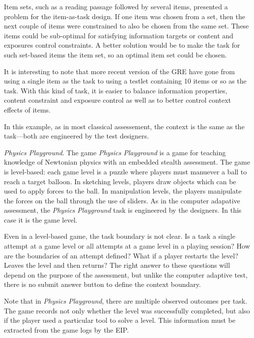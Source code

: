 \documentclass{article}
\begin{document}
  Item sets, such as a reading passage followed by several items,
  presented a problem for the item-as-task design.  If one item was
  chosen from a set, then the next couple of items were constrained to
  also be chosen from the same set.  These items could be sub-optimal
  for satisfying information targets or content and exposures control
  constraints.  A better solution would be to make the task for such
  set-based items the item set, so an optimal item set could be
  chosen.

  It is interesting to note that more recent version of the GRE have
  gone from using a single item as the task to using a testlet
  containing 10 items or so as the task.  With this kind of task, it
  is easier to balance information properties, content constraint and
  exposure control as well as to better control context effects of
  items.

  In this example, as in most classical assessement, the context is
  the same as the task---both are engineered by the test designers.

  \noindent\textit{Physics Playground}.  The game \textit{Physics
    Playground} \cite{ShuteVentura2013,KimPhysicsPlayground} is a
  game for teaching knowledge of Newtonian physics with an embedded
  stealth assessment.  The game is level-based: each game level
  is a puzzle where players must manuever a ball to reach a target
  balloon.  In sketching levels, players draw objects which can be
  used to apply forces to the ball.  In manipulation levels, the
  players manipulate the forces on the ball through the use of
  sliders. As in the computer adapative assessment, the
  \textit{Physics Playground} task is engineered by the designers.  In
  this case it is the game level.

  Even in a level-based game, the task boundary is not clear.  Is a
  task a single attempt at a game level or all attempts at a game
  level in a playing session?  How are the boundaries of an attempt
  defined?  What if a player restarts the level?  Leaves the level and
  then returns?  The right answer to these questions will depend on
  the purpose of the assessment, but unlike the computer adaptive
  test, there is no submit answer button to define the context
  boundary.

  Note that in \textit{Physics Playground}, there are multiple
  observed outcomes per task.  The game records not only whether the
  level was successfully completed, but also if the player used a
  particular tool to solve a level.  This information must be
  extracted from the game logs by the EIP.
\end{document}
